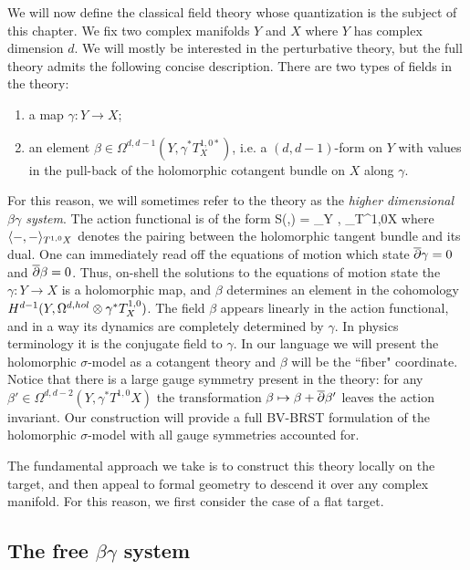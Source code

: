 \documentclass[10pt]{amsart}
\begin{document}
We will now define the classical field theory whose quantization is the subject of this chapter.
We fix two complex manifolds $Y$ and $X$ where $Y$ has complex dimension $d$. 
We will mostly be interested in the perturbative theory, but the full theory admits the following concise description.
There are two types of fields in the theory:
\begin{enumerate}
\item a map $\gamma : Y \to X$;
\item an element $\beta \in \Omega^{d, d-1} (Y , \gamma^* T^{1,0*}_X)$, i.e. a $(d,d-1)$-form on $Y$ with values in the pull-back of the holomorphic cotangent bundle on $X$ along $\gamma$.
\end{enumerate}
For this reason, we will sometimes refer to the theory as the {\em higher dimensional $\beta\gamma$ system}.
The action functional is of the form 
\ben
S(\beta,\gamma) = \int_Y \<\beta, \dbar \gamma\>_{T^{1,0}X}
\een
where $\langle-,-\rangle_{T^{1,0}X}$ denotes the pairing between the holomorphic tangent bundle and its dual.
One can immediately read off the equations of motion which state $\overline{\partial} \gamma = 0$ and $\overline{\partial} \beta = 0$.
Thus, on-shell the solutions to the equations of motion state the $\gamma : Y \to X$ is a holomorphic map, and $\beta$ determines an element in the cohomology $H^{d-1}(Y , \Omega^{d,hol} \otimes \gamma^* T_X^{1,0})$. 
The field $\beta$ appears linearly in the action functional, and in a way its dynamics are completely determined by $\gamma$. 
In physics terminology it is the conjugate field to $\gamma$. 
In our language we will present the holomorphic $\sigma$-model as a cotangent theory and $\beta$ will be the ``fiber" coordinate. 
Notice that there is a large gauge symmetry present in the theory: for any $\beta' \in \Omega^{d,d-2}(Y , \gamma^*T^{1,0}X)$ the transformation $\beta \mapsto \beta + \overline{\partial} \beta'$ leaves the action invariant. 
Our construction will provide a full BV-BRST formulation of the holomorphic $\sigma$-model with all gauge symmetries accounted for. 

The fundamental approach we take is to construct this theory locally on the target, and then appeal to formal geometry to descend it over any complex manifold.
For this reason, we first consider the case of a flat target.

\subsection{The free $\beta\gamma$ system}
\end{document}
